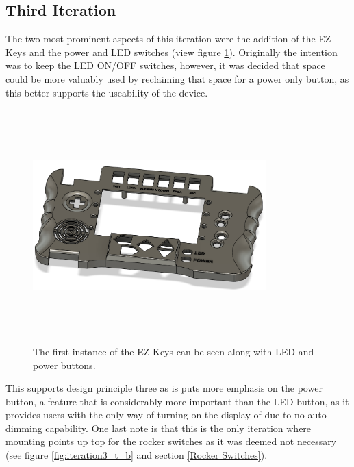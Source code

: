 \subsection{Third Iteration}

The two most prominent aspects of this iteration were the addition of the EZ Keys and the power and LED switches (view figure \ref{fig:iteration3_t_f}).
Originally the intention was to keep the LED ON/OFF switches, however, it was decided that space could be more valuably used by reclaiming that space for a power only button, as this better supports the useability of the device.

\begin{figure} [h]
    \centering
    \includegraphics[width=9cm,height=9cm,keepaspectratio]{Figures/iteration3_top_front.png}
    \caption{The first instance of the EZ Keys can be seen along with LED and power buttons.}
    \label{fig:iteration3_t_f}
\end{figure}

This supports design principle three as is puts more emphasis on the power button, a feature that is considerably more important than the LED button, as it provides users with the only way of turning on the display of due to no auto-dimming capability.
One last note is that this is the only iteration where mounting points up top for the rocker switches as it was deemed not necessary (see figure \ref{fig:iteration3_t_b} and section \ref{Rocker Switches}).

